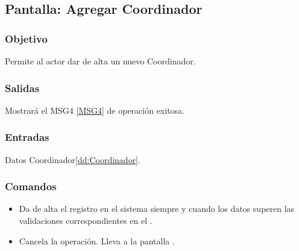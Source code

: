 \subsection{Pantalla: Agregar Coordinador}

\subsubsection{Objetivo}
Permite al actor dar de alta un nuevo Coordinador.


\subsubsection{Salidas}
Mostrará el MSG4 \ref{MSG4} de operación exitosa.

\subsubsection{Entradas}
Datos Coordinador\ref{dd:Coordinador}.

\subsubsection{Comandos}
\begin{itemize}
 \item {} Da de alta el registro en el sistema siempre y cuando los datos superen las validaciones correspondientes en el .
 \item {} Cancela la operación. Lleva a la pantalla .
\end{itemize}


